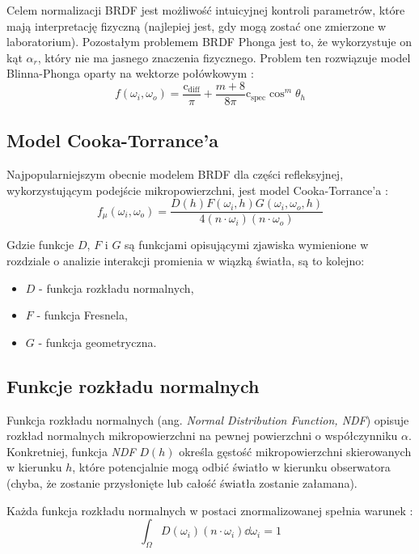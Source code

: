 \documentclass[../main.tex]{subfiles}
\newcommand{\cdiff}{\text{c}_{\text{diff}}}
\newcommand{\cspec}{\text{c}_{\text{spec}}}
\begin{document}
Celem normalizacji BRDF jest możliwość intuicyjnej kontroli parametrów, które mają interpretację fizyczną (najlepiej jest, gdy mogą zostać one zmierzone w laboratorium). Pozostałym problemem BRDF Phonga jest to, że wykorzystuje on kąt $\alpha_r$, który nie ma jasnego znaczenia fizycznego. Problem ten rozwiązuje model Blinna-Phonga oparty na wektorze połówkowym \cite{RealTimeRendering2008}:
\[
  f(\omega_i, \omega_o) = \frac{\cdiff}{\pi} + \frac{m+8}{8\pi} {\cspec \cos^{m} \theta_h}
\]

\subsection{Model Cooka-Torrance'a}

Najpopularniejszym obecnie modelem BRDF dla części refleksyjnej, wykorzystującym podejście mikropowierzchni, jest model Cooka-Torrance'a \cite{CookTorrance}:
\begin{displaymath}
  f_{\mu}(\omega_i, \omega_o) = \frac{
    D(h) F(\omega_i, h) G(\omega_i, \omega_o, h)
  }{
    4 (n \cdot \omega_i) (n \cdot \omega_o)
  }
\end{displaymath}

Gdzie funkcje $D$, $F$ i $G$ są funkcjami opisującymi zjawiska wymienione w rozdziale o analizie interakcji promienia w wiązką światła, są to kolejno:

\begin{itemize}
  \item $D$ - funkcja rozkładu normalnych,
  \item $F$ - funkcja Fresnela,
  \item $G$ - funkcja geometryczna.
\end{itemize}

\subsection{Funkcje rozkładu normalnych}

Funkcja rozkładu normalnych (ang. \textit{Normal Distribution Function, NDF})
opisuje rozkład normalnych mikropowierzchni na pewnej powierzchni o
współczynniku $\alpha$. Konkretniej, funkcja \textit{NDF} $D(h)$ określa
gęstość mikropowierzchni skierowanych w kierunku $h$, które potencjalnie mogą
odbić światło w kierunku obserwatora (chyba, że zostanie przysłonięte lub
całość światła zostanie załamana).

Każda funkcja rozkładu normalnych w postaci znormalizowanej spełnia warunek \cite{NDFReed}:
\[
  \int_{\Omega} {
    D(\omega_i)
    (n \cdot \omega_i)
    \dd \omega_i
  } = 1
\]
\end{document}
